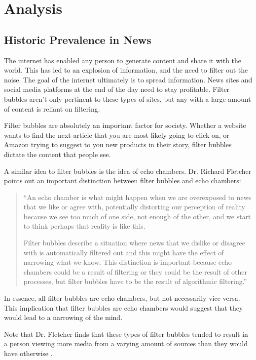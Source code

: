 \documentclass[12pt]{article}
\begin{document}
\section{Analysis}
\subsection{Historic Prevalence in News}
The internet has enabled any person to generate content and share it with the
world. This has led to an explosion of information, and the need to filter out
the noise. The goal of the internet ultimately is to spread information. News
sites and social media platforms at the end of the day need to stay profitable.
Filter bubbles aren't only pertinent to these types of sites, but any with a
large amount of content is reliant on filtering.

Filter bubbles are absolutely an important factor for society. Whether a website
wants to find the next article that you are most likely going to click on, or
Amazon trying to suggest to you new products in their story, filter bubbles
dictate the content that people see.

A similar idea to filter bubbles is the idea of echo chambers. Dr. Richard
Fletcher points out an important distinction between filter bubbles and echo
chambers:

\begin{quote}
    ``An echo chamber is what might happen when we are overexposed to news that
    we like or agree with, potentially distorting our perception of reality
    because we see too much of one side, not enough of the other, and we start
    to think perhaps that reality is like this.

    Filter bubbles describe a situation where news that we dislike or disagree
    with is automatically filtered out and this might have the effect of
    narrowing what we know. This distinction is important because echo chambers
    could be a result of filtering or they could be the result of other
    processes, but filter bubbles have to be the result of algorithmic
    filtering.'' \cite{richard}
\end{quote}

In essence, all filter bubbles are echo chambers, but not necessarily
vice-versa. This implication that filter bubbles are echo chambers would suggest
that they would lead to a narrowing of the mind.

Note that Dr. Fletcher finds that these types of filter bubbles tended to result
in a person viewing more media from a varying amount of sources than they would
have otherwise \cite{richard}.
\end{document}
